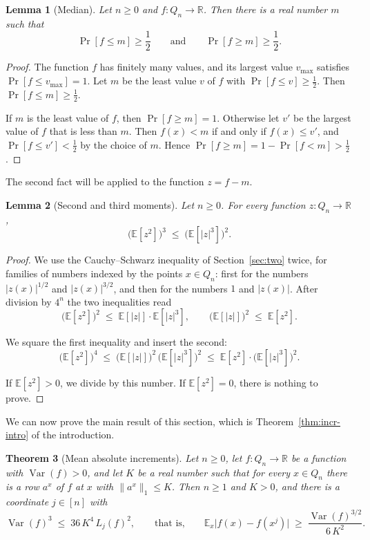 \documentclass[11pt,reqno]{amsart}
\newtheorem{theorem}{Theorem}[section]
\newtheorem{lemma}[theorem]{Lemma}
\theoremstyle{definition}
\theoremstyle{remark}
\numberwithin{equation}{section}
\theoremstyle{named}
\theoremstyle{plain}
\newcommand{\R}{\mathbb{R}}
\newcommand{\E}{\mathbb{E}}
\newcommand{\Var}{\operatorname{Var}}
\newcommand{\norm}[1]{\lVert #1\rVert_1}
\newcommand{\abs}[1]{\lvert #1\rvert}
\begin{document}
\begin{lemma}[Median]\label{lem:median}
Let $n\ge0$ and $f\colon Q_n\to\R$. Then there is a real number $m$ such that
\[
   \Pr[f\le m]\ge\frac12\qquad\text{and}\qquad\Pr[f\ge m]\ge\frac12 .
\]
\end{lemma}

\begin{proof}
The function $f$ has finitely many values, and its largest value $v_{\max}$ satisfies
$\Pr[f\le v_{\max}]=1$. Let $m$ be the least value $v$ of $f$ with $\Pr[f\le v]\ge\frac12$. Then
$\Pr[f\le m]\ge\frac12$.

If $m$ is the least value of $f$, then $\Pr[f\ge m]=1$. Otherwise let $v'$ be the largest value of
$f$ that is less than $m$. Then $f(x)<m$ if and only if $f(x)\le v'$, and $\Pr[f\le v']<\frac12$ by
the choice of $m$. Hence $\Pr[f\ge m]=1-\Pr[f<m]>\frac12$.
\end{proof}

The second fact will be applied to the function $z=f-m$.

\begin{lemma}[Second and third moments]\label{lem:power}
Let $n\ge0$. For every function $z\colon Q_n\to\R$,
\[
   \bigl(\E[z^{2}]\bigr)^{3}\;\le\;\bigl(\E[\abs{z}^{3}]\bigr)^{2}.
\]
\end{lemma}

\begin{proof}
We use the Cauchy--Schwarz inequality of Section~\ref{sec:two} twice, for families of numbers
indexed by the points $x\in Q_n$: first for the numbers $\abs{z(x)}^{1/2}$ and
$\abs{z(x)}^{3/2}$, and then for the numbers $1$ and $\abs{z(x)}$. After division by $4^{n}$ the
two inequalities read
\[
   \bigl(\E[z^{2}]\bigr)^{2}\;\le\;\E[\abs{z}]\cdot\E[\abs{z}^{3}],\qquad
   \bigl(\E[\abs{z}]\bigr)^{2}\;\le\;\E[z^{2}].
\]

We square the first inequality and insert the second:
\[
   \bigl(\E[z^{2}]\bigr)^{4}\;\le\;\bigl(\E[\abs{z}]\bigr)^{2}\,\bigl(\E[\abs{z}^{3}]\bigr)^{2}
   \;\le\;\E[z^{2}]\cdot\bigl(\E[\abs{z}^{3}]\bigr)^{2}.
\]

If $\E[z^{2}]>0$, we divide by this number. If $\E[z^{2}]=0$, there is nothing to prove.
\end{proof}

We can now prove the main result of this section, which is Theorem~\ref{thm:incr-intro} of the
introduction.

\begin{theorem}[Mean absolute increments]\label{thm:incr}
Let $n\ge0$, let $f\colon Q_n\to\R$ be a function with $\Var(f)>0$, and let $K$ be a real number
such that for every $x\in Q_n$ there is a row $a^{x}$ of $f$ at $x$ with $\norm{a^{x}}\le K$. Then
$n\ge1$ and $K>0$, and there is a coordinate $j\in[n]$ with
\[
   \Var(f)^{3}\;\le\;36\,K^{4}\,L_j(f)^{2},\qquad\text{that is,}\qquad
   \E_x\abs{f(x)-f(x^{j})}\;\ge\;\frac{\Var(f)^{3/2}}{6\,K^{2}} .
\]
\end{theorem}
\end{document}
